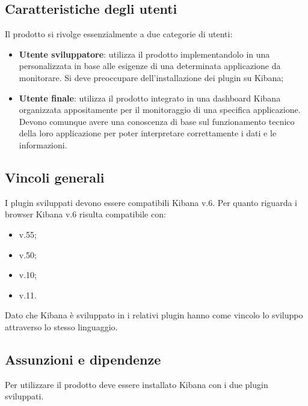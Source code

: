 	\subsection{Caratteristiche degli utenti}
	Il prodotto si rivolge essenzialmente a due categorie di utenti:
	\begin{itemize}
		\item \textbf{Utente sviluppatore}: utilizza il prodotto implementandolo in una  personalizzata in base alle esigenze di una determinata applicazione da monitorare. Si deve preoccupare dell'installazione dei plugin su Kibana;
		\item \textbf{Utente finale}: utilizza il prodotto integrato in una dashboard Kibana organizzata appositamente per il monitoraggio di una specifica applicazione. Devono comunque avere una conoscenza di base sul funzionamento tecnico della loro applicazione per poter interpretare correttamente i dati e le informazioni.
	\end{itemize}
	\subsection{Vincoli generali}
	I plugin sviluppati devono essere compatibili  Kibana v.6.
	Per quanto riguarda i browser Kibana v.6 risulta compatibile con: 
	\begin{itemize}
		\item {} v.55;
		\item {} v.50;
		\item {} v.10;
		\item {} v.11.
	\end{itemize}
	Dato che Kibana è sviluppato in  i relativi plugin hanno come vincolo lo sviluppo attraverso lo stesso linguaggio.
	
	\subsection{Assunzioni e dipendenze}
	Per utilizzare il prodotto deve essere installato Kibana con i due plugin sviluppati. 
	
